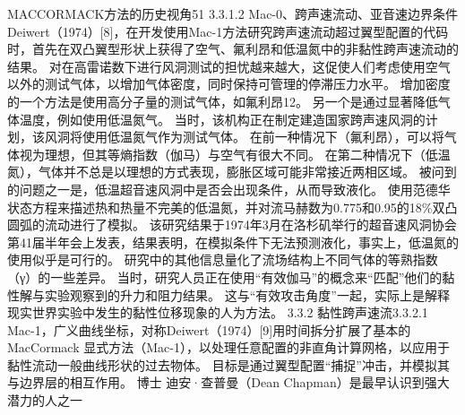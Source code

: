 \documentclass[UTF8,11pt,a4paper,openany,fontset=fandol]{ctexbook}
\begin{document}
MACCORMACK方法的历史视角51 3.3.1.2 Mac-0、跨声速流动、亚音速边界条件 Deiwert（1974）[8]，在开发使用Mac-1方法研究跨声速流动超过翼型配置的代码时，首先在双凸翼型形状上获得了空气、氟利昂和低温氮中的非黏性跨声速流动的结果。 对在高雷诺数下进行风洞测试的担忧越来越大，这促使人们考虑使用空气以外的测试气体，以增加气体密度，同时保持可管理的停滞压力水平。 增加密度的一个方法是使用高分子量的测试气体，如氟利昂12。 另一个是通过显著降低气体温度，例如使用低温氮气。 当时，该机构正在制定建造国家跨声速风洞的计划，该风洞将使用低温氮气作为测试气体。 在前一种情况下（氟利昂），可以将气体视为理想，但其等熵指数（伽马）与空气有很大不同。 在第二种情况下（低温氮），气体并不总是以理想的方式表现，膨胀区域可能非常接近两相区域。 被问到的问题之一是，低温超音速风洞中是否会出现条件，从而导致液化。 使用范德华状态方程来描述热和热量不完美的低温氮，并对流马赫数为0.775和0.95的18\%双凸圆弧的流动进行了模拟。 该研究结果于1974年3月在洛杉矶举行的超音速风洞协会第41届半年会上发表，结果表明，在模拟条件下无法预测液化，事实上，低温氮的使用似乎是可行的。 研究中的其他信息量化了流场结构上不同气体的等熟指数（γ）的一些差异。 当时，研究人员正在使用“有效伽马”的概念来“匹配”他们的黏性解与实验观察到的升力和阻力结果。 这与“有效攻击角度”一起，实际上是解释现实世界实验中发生的黏性位移现象的人为方法。 3.3.2 黏性跨声速流3.3.2.1 Mac-1，广义曲线坐标，对称Deiwert（1974）[9]用时间拆分扩展了基本的MacCormack 显式方法（Mac-1），以处理任意配置的非直角计算网格，以应用于黏性流动一般曲线形状的过去物体。 目标是通过翼型配置“捕捉”冲击，并模拟其与边界层的相互作用。 博士 迪安·查普曼（Dean Chapman）是最早认识到强大潜力的人之一
\end{document}

